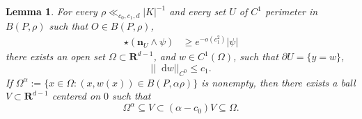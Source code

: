 \documentclass[reqno,10pt]{amsart}
\newcommand{\RR}{\mathbf{R}}
\newcommand*\dif{\mathop{}\!\mathrm{d}}
\newcommand{\normal}{\mathbf n}
\newtheorem{lemma}[theorem]{Lemma}
\theoremstyle{definition}
\numberwithin{equation}{section}
\begin{document}
\begin{lemma}\label{rep as a good graph}
For every $\rho \ll_{c_0, c_1, d} |K|^{-1}$ and every set $U$ of $C^1$ perimeter in $B(P, \rho)$ such that $O \in B(P, \rho)$,
\begin{align}
\star(\normal_U \wedge \psi) &\geq e^{-o(c_1^2)} |\psi| \label{rep as a good graph hyp}
\end{align}
there exists an open set $\Omega \subset \RR^{d - 1}$, and $w \in C^1(\Omega)$, such that $\partial U = \{y = w\}$,
\begin{equation}\label{rep as a good graph small derivative}
||\dif w||_{C^0} \leq c_1.
\end{equation}
If $\Omega^\alpha := \{x \in \Omega: (x, w(x)) \in B(P, \alpha \rho)\}$ is nonempty, then there exists a ball $V \subset \RR^{d - 1}$ centered on $0$ such that
\begin{equation}\label{rep as a good graph set nests}
    \Omega^\alpha \subseteq V \subset (\alpha - c_0) V \subseteq \Omega.
\end{equation}
\end{lemma}
\end{document}
